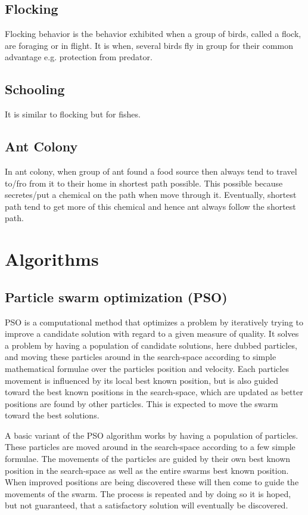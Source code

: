 \subsection{Flocking}
Flocking behavior is the behavior exhibited when a group of birds, called a flock, are foraging or in flight. It is when, several birds fly in group for their common advantage e.g. protection from predator.

\subsection{Schooling}
It is similar to flocking but for fishes.

\subsection{Ant Colony}
In ant colony, when group of ant found a food source then always tend to travel to/fro from it to their home in shortest path possible. This possible because secretes/put a chemical on the path when move through it. Eventually, shortest path tend to get more of this chemical and hence ant always follow the shortest path.



\section{Algorithms}

\subsection{Particle swarm optimization (PSO)}
PSO is a computational method that optimizes a problem by iteratively trying to improve a candidate solution with regard to a given measure of quality. It solves a problem by having a population of candidate solutions, here dubbed particles, and moving these particles around in the search-space according to simple mathematical formulae over the particles position and velocity. Each particles movement is influenced by its local best known position, but is also guided toward the best known positions in the search-space, which are updated as better positions are found by other particles. This is expected to move the swarm toward the best solutions.\cite{PSO}


A basic variant of the PSO algorithm works by having a population of particles. These particles are moved around in the search-space according to a few simple formulae. The movements of the particles are guided by their own best known position in the search-space as well as the entire swarms best known position. When improved positions are being discovered these will then come to guide the movements of the swarm. The process is repeated and by doing so it is hoped, but not guaranteed, that a satisfactory solution will eventually be discovered.\cite{PSO}


